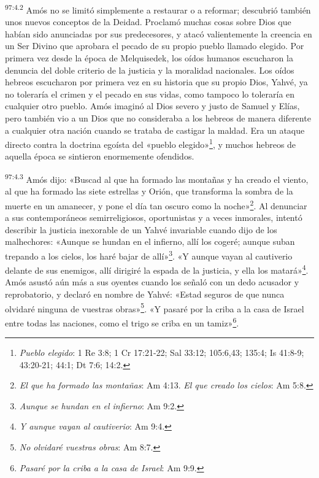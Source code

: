 \par
\textsuperscript{97:4.2} Amós no se limitó simplemente a restaurar o a reformar; descubrió también unos nuevos conceptos de la Deidad. Proclamó muchas cosas sobre Dios que habían sido anunciadas por sus predecesores, y atacó valientemente la creencia en un Ser Divino que aprobara el pecado de su propio pueblo llamado elegido. Por primera vez desde la época de Melquisedek, los oídos humanos escucharon la denuncia del doble criterio de la justicia y la moralidad nacionales. Los oídos hebreos escucharon por primera vez en su historia que su propio Dios, Yahvé, ya no toleraría el crimen y el pecado en sus vidas, como tampoco lo toleraría en cualquier otro pueblo. Amós imaginó al Dios severo y justo de Samuel y Elías, pero también vio a un Dios que no consideraba a los hebreos de manera diferente a cualquier otra nación cuando se trataba de castigar la maldad. Era un ataque directo contra la doctrina egoísta del «pueblo elegido»\footnote{\textit{Pueblo elegido}: 1 Re 3:8; 1 Cr 17:21-22; Sal 33:12; 105:6,43; 135:4; Is 41:8-9; 43:20-21; 44:1; Dt 7:6; 14:2.}, y muchos hebreos de aquella época se sintieron enormemente ofendidos.

\par
\textsuperscript{97:4.3} Amós dijo: «Buscad al que ha formado las montañas y ha creado el viento, al que ha formado las siete estrellas y Orión, que transforma la sombra de la muerte en un amanecer, y pone el día tan oscuro como la noche»\footnote{\textit{El que ha formado las montañas}: Am 4:13. \textit{El que creado los cielos}: Am 5:8.}. Al denunciar a sus contemporáneos semirreligiosos, oportunistas y a veces inmorales, intentó describir la justicia inexorable de un Yahvé invariable cuando dijo de los malhechores: «Aunque se hundan en el infierno, allí los cogeré; aunque suban trepando a los cielos, los haré bajar de allí»\footnote{\textit{Aunque se hundan en el infierno}: Am 9:2.}. «Y aunque vayan al cautiverio delante de sus enemigos, allí dirigiré la espada de la justicia, y ella los matará»\footnote{\textit{Y aunque vayan al cautiverio}: Am 9:4.}. Amós asustó aún más a sus oyentes cuando los señaló con un dedo acusador y reprobatorio, y declaró en nombre de Yahvé: «Estad seguros de que nunca olvidaré ninguna de vuestras obras»\footnote{\textit{No olvidaré vuestras obras}: Am 8:7.}. «Y pasaré por la criba a la casa de Israel entre todas las naciones, como el trigo se criba en un tamiz»\footnote{\textit{Pasaré por la criba a la casa de Israel}: Am 9:9.}.

